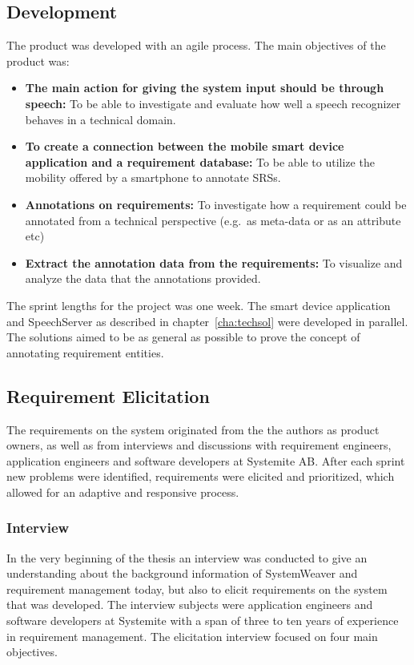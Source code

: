 \subsection{Development}
\label{subsec:devel}
The product was developed with an agile process. The main objectives of the product was:

\begin{itemize}
  \item \textbf{The main action for giving the system input should be through speech: }To be able to investigate and evaluate how well a speech recognizer behaves in a technical domain.
  \item \textbf{To create a connection between the mobile smart device application and a requirement database: } To be able to utilize the mobility offered by a smartphone to annotate SRSs.
  \item \textbf{Annotations on requirements: }To investigate how a requirement could be annotated from a technical perspective (e.g.\ as meta-data or as an attribute etc)
  \item \textbf{Extract the annotation data from the requirements: }To visualize and analyze the data that the annotations provided.
\end{itemize}

The sprint lengths for the project was one week. The smart device application and SpeechServer as described in chapter~\ref{cha:techsol} were developed in parallel. The solutions aimed to be as general as possible to prove the concept of annotating requirement entities.

\subsection{Requirement Elicitation}
\label{sec:elicitation}
The requirements on the system originated from the the authors as product owners, as well as from interviews and discussions with requirement engineers, application engineers and software developers at Systemite AB. After each sprint new problems were identified, requirements were elicited and prioritized, which allowed for an adaptive and responsive process. 

\subsubsection{Interview}
\label{subsec:elicitationint}
In the very beginning of the thesis an interview was conducted to give an understanding about the background information of SystemWeaver and requirement management today, but also to elicit requirements on the system that was developed. The interview subjects were application engineers and software developers at Systemite with a span of three to ten years of experience in requirement management. The elicitation interview focused on four main objectives. \\

